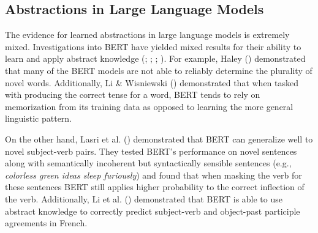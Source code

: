 \documentclass[
  12pt,
  letterpaper,
]{scrreport}
\begin{document}
\subsection{Abstractions in Large Language
Models}\label{abstractions-in-large-language-models}

The evidence for learned abstractions in large language models is
extremely mixed. Investigations into BERT have yielded mixed results for
their ability to learn and apply abstract knowledge
(;
;
;
). For
example, Haley () demonstrated
that many of the BERT models are not able to reliably determine the
plurality of novel words. Additionally, Li \& Wisniewski
() demonstrated that when
tasked with producing the correct tense for a word, BERT tends to rely
on memorization from its training data as opposed to learning the more
general linguistic pattern.

On the other hand, Lasri et al.
() demonstrated that
BERT can generalize well to novel subject-verb pairs. They tested BERT's
performance on novel sentences along with semantically incoherent but
syntactically sensible sentences (e.g., \emph{colorless green ideas
sleep furiously}) and found that when masking the verb for these
sentences BERT still applies higher probability to the correct
inflection of the verb. Additionally, Li et al.
() demonstrated
that BERT is able to use abstract knowledge to correctly predict
subject-verb and object-past participle agreements in French.
\end{document}
